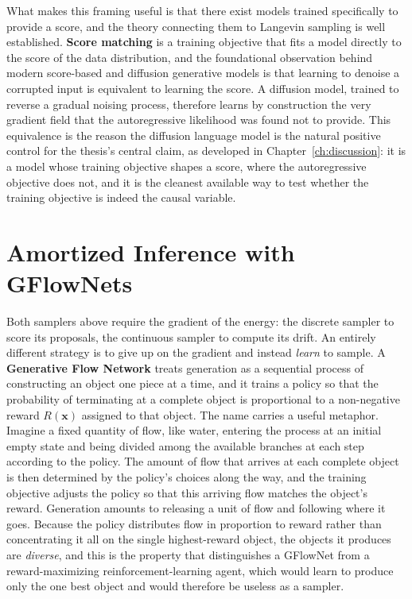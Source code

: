 What makes this framing useful is that there exist models trained specifically to provide a score, and the theory connecting them to Langevin sampling is well established. \textbf{Score matching} \citep{vincent2011connection} is a training objective that fits a model directly to the score of the data distribution, and the foundational observation behind modern score-based and diffusion generative models \citep{song2019generative, ho2020denoising} is that learning to denoise a corrupted input is equivalent to learning the score. A diffusion model, trained to reverse a gradual noising process, therefore learns by construction the very gradient field that the autoregressive likelihood was found not to provide. This equivalence is the reason the diffusion language model is the natural positive control for the thesis's central claim, as developed in Chapter~\ref{ch:discussion}: it is a model whose training objective shapes a score, where the autoregressive objective does not, and it is the cleanest available way to test whether the training objective is indeed the causal variable.

\section{Amortized Inference with GFlowNets}
\label{sec:bg-gflownet}

Both samplers above require the gradient of the energy: the discrete sampler to score its proposals, the continuous sampler to compute its drift. An entirely different strategy is to give up on the gradient and instead \emph{learn} to sample. A \textbf{Generative Flow Network} \citep{bengio2021flow, bengio2023gflownet} treats generation as a sequential process of constructing an object one piece at a time, and it trains a policy so that the probability of terminating at a complete object is proportional to a non-negative reward $R(\bm{x})$ assigned to that object. The name carries a useful metaphor. Imagine a fixed quantity of flow, like water, entering the process at an initial empty state and being divided among the available branches at each step according to the policy. The amount of flow that arrives at each complete object is then determined by the policy's choices along the way, and the training objective adjusts the policy so that this arriving flow matches the object's reward. Generation amounts to releasing a unit of flow and following where it goes. Because the policy distributes flow in proportion to reward rather than concentrating it all on the single highest-reward object, the objects it produces are \emph{diverse}, and this is the property that distinguishes a GFlowNet from a reward-maximizing reinforcement-learning agent, which would learn to produce only the one best object and would therefore be useless as a sampler.

